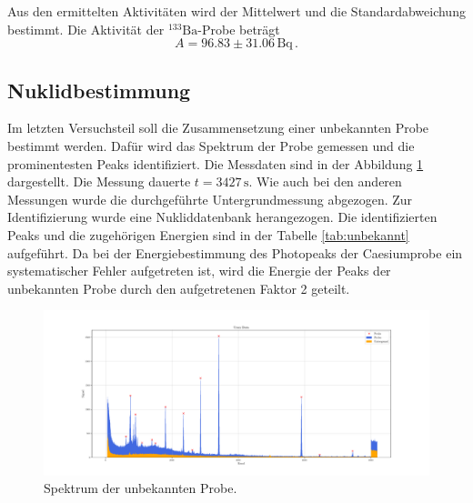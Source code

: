 Aus den ermittelten Aktivitäten wird der Mittelwert und die Standardabweichung bestimmt.
Die Aktivität der $^{133}\text{Ba}$-Probe beträgt
\begin{equation*}
  A = 96.83 \pm 31.06 \, \si{\becquerel} \, .
\end{equation*}

\subsection{Nuklidbestimmung} \label{sec:nuklid}
Im letzten Versuchsteil soll die Zusammensetzung einer unbekannten Probe bestimmt werden.
Dafür wird das Spektrum der Probe gemessen und die prominentesten Peaks identifiziert.
Die Messdaten sind in der Abbildung \ref{fig:unbekannt} dargestellt.
Die Messung dauerte $t = 3427 \, \si{\second}$.
Wie auch bei den anderen Messungen wurde die durchgeführte Untergrundmessung abgezogen.
Zur Identifizierung wurde eine Nukliddatenbank \cite{Lara} herangezogen.
Die identifizierten Peaks und die zugehörigen Energien sind in der Tabelle \ref{tab:unbekannt} aufgeführt.
Da bei der Energiebestimmung des Photopeaks der Caesiumprobe ein systematischer Fehler aufgetreten ist, wird die Energie der Peaks der unbekannten Probe durch den aufgetretenen Faktor 2 geteilt.
\begin{figure}[H]
  \centering
  \includegraphics[width=\textwidth]{../plots/Uran.pdf}
  \caption{Spektrum der unbekannten Probe.}
  \label{fig:unbekannt}
\end{figure}


